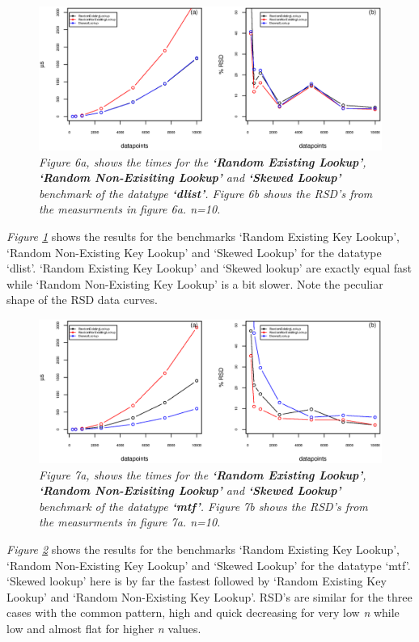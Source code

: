 \documentclass[a4paper,11pt,twoside]{article}
\begin{document}
\begin{figure}[H] 
\centering 
\includegraphics[width=\textwidth]{figures/fig6.eps}
\caption{\textit{Figure 6a, shows the times for the \textbf{`Random Existing
    Lookup'}, \textbf{`Random Non-Exisiting Lookup'} and
  \textbf{`Skewed Lookup'} benchmark of the datatype \textbf{`dlist'}. Figure 6b shows the RSD's from the measurments
in figure 6a. n=10.}}
\label{fig:dlist}
\end{figure}

\textit{Figure \ref{fig:dlist}} shows the results for the benchmarks
`Random Existing Key Lookup', `Random Non-Existing Key Lookup' and
`Skewed Lookup' for the datatype `dlist'. `Random Existing Key Lookup' and
`Skewed lookup' are exactly equal fast while `Random Non-Existing Key
Lookup' is a bit slower. Note the peculiar shape of the RSD data curves.

\begin{figure}[H] 
\centering 
\includegraphics[width=\textwidth]{figures/fig7.eps}
\caption{\textit{Figure 7a, shows the times for the \textbf{`Random Existing
    Lookup'}, \textbf{`Random Non-Exisiting Lookup'} and
  \textbf{`Skewed Lookup'} benchmark of the datatype \textbf{`mtf'}. Figure 7b shows the RSD's from the measurments
in figure 7a. n=10.}}
\label{fig:mtf}
\end{figure}

\textit{Figure \ref{fig:mtf}} shows the results for the benchmarks
`Random Existing Key Lookup', `Random Non-Existing Key Lookup' and
`Skewed Lookup' for the datatype `mtf'. `Skewed lookup' here is by 
far the fastest followed by `Random Existing Key Lookup' and 
`Random Non-Existing Key Lookup'. RSD's are similar for the three
cases with the common pattern, high and quick decreasing for very low
\textit{n} while low and almost flat for higher \textit{n} values.
\end{document}
